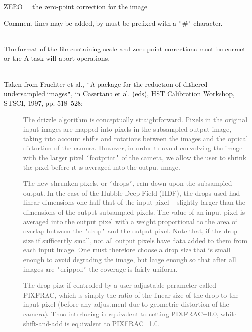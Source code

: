 \documentclass[twoside,11pt]{article}
\renewcommand{\_}{\texttt{\symbol{95}}}
\newcommand{\sstdiytopic}[2]{\item[#1:] \mbox{} \\[1.3ex] #2}
\newcommand{\sstitem}{\item}
\newcommand{\sstdiytopic}[2]{\item[{#1:}] #2 }
\newcommand{\sstitem}{\item}
\begin{document}
{{{      \sstitem
            ZERO   = the zero-point correction for the image
      }
      Comment lines may be added, by must be prefixed with a {\tt "}\#{\tt "}
      character.
   }
   \sstdiytopic{
      Pitfalls
   }{
      The format of the file containing scale and zero-point corrections
      must be correct or the A-task will abort operations.
   }
   \sstdiytopic{
      Algorithms Used
   }{
      Taken from Fruchter et al., {\tt "}A package for the reduction of dithered
      undersampled images{\tt "}, in Casertano et al. (eds), HST Calibration
      Workshop, STSCI, 1997, pp. 518--528:
      \begin{quotation}
       The drizzle algorithm is conceptually straightforward. Pixels in
       the original input images are mapped into pixels in the subsampled
       output image, taking into account shifts and rotations between the
       images and the optical distortion of the camera. However, in order
       to avoid convolving the image with the larger pixel {\tt `}footprint{\tt '} of
       the camera, we allow the user to shrink the pixel before it is
       averaged into the output image.

       The new shrunken pixels, or {\tt `}drops{\tt '}, rain down upon the subsampled
       output. In the case of the Hubble Deep Field (HDF), the drops used
       had linear dimensions one-half that of the input pixel -- slightly
       larger than the dimensions of the output subsampled pixels. The value
       of an input pixel is averaged into the output pixel with a weight
       proportional to the area of overlap between the {\tt `}drop{\tt '} and the output
       pixel. Note that, if the drop size if sufficently small, not all
       output pixels have data added to them from each input image. One
       must therefore choose a drop size that is small enough to avoid
       degrading the image, but large enough so that after all images
       are {\tt `}dripped{\tt '} the coverage is fairly uniform.

       The drop pize if controlled by a user-adjustable parameter called
       PIXFRAC, which is simply the ratio of the linear size of the drop to
       the input pixel (before any adjustment due to geometric distortion
       of the camera). Thus interlacing is equivalent to setting PIXFRAC=0.0,
       while shift-and-add is equivalent to PIXFRAC=1.0.


\end{quotation}}}
\end{document}

